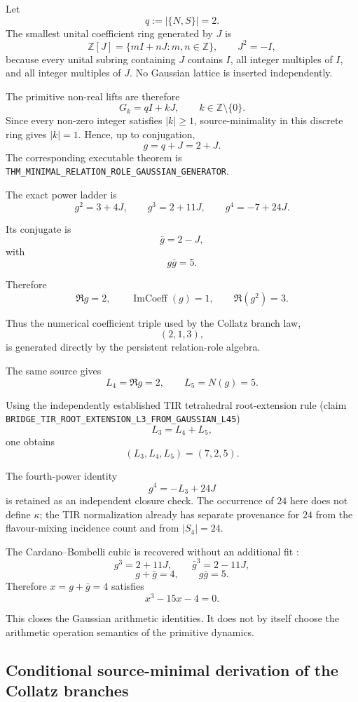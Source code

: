 \documentclass[11pt]{article}
\newcommand{\claimid}[1]{\nolinkurl{#1}}
\begin{document}
Let
\[
q:=|\{N,S\}|=2.
\]
The smallest unital coefficient ring generated by \(J\) is
\[
\boxed{
\mathbb Z[J]
=
\{mI+nJ:m,n\in\mathbb Z\},
\qquad
J^2=-I,
}
\]
because every unital subring containing \(J\) contains \(I\), all integer
multiples of \(I\), and all integer multiples of \(J\). No Gaussian lattice
is inserted independently.

The primitive non-real lifts are therefore
\[
G_k=qI+kJ,
\qquad
k\in\mathbb Z\setminus\{0\}.
\]
Since every non-zero integer satisfies \(|k|\ge1\), source-minimality in this
discrete ring gives \(|k|=1\). Hence, up to conjugation,
\[
\boxed{
g=q+J=2+J.
}
\]
The corresponding executable theorem is
\claimid{THM_MINIMAL_RELATION_ROLE_GAUSSIAN_GENERATOR}.

The exact power ladder is
\[
\boxed{
g^2=3+4J,
\qquad
g^3=2+11J,
\qquad
g^4=-7+24J.
}
\]

Its conjugate is
\[
\bar g=2-J,
\]
with
\[
\boxed{
g\bar g=5.
}
\]

Therefore
\[
\boxed{
\Re g=2,
\qquad
\operatorname{ImCoeff}(g)=1,
\qquad
\Re(g^2)=3.
}
\]

Thus the numerical coefficient triple used by the Collatz branch law,
\[
(2,1,3),
\]
is generated directly by the persistent relation-role algebra.

The same source gives
\[
\boxed{
L_4=\Re g=2,
\qquad
L_5=N(g)=5.
}
\]

Using the independently established TIR tetrahedral root-extension rule
(claim \claimid{BRIDGE_TIR_ROOT_EXTENSION_L3_FROM_GAUSSIAN_L45})
\cite{LipaTIRLConstants2026}
\[
L_3=L_4+L_5,
\]
one obtains
\[
\boxed{
(L_3,L_4,L_5)=(7,2,5).
}
\]

The fourth-power identity
\[
\boxed{
g^4=-L_3+24J
}
\]
is retained as an independent closure check. The occurrence of \(24\) here
does not define \(\kappa\); the TIR normalization already has separate
provenance for \(24\) from the flavour-mixing incidence count and from
\(|S_4|=24\).

The Cardano--Bombelli cubic is recovered without an additional fit
\cite{Cardano1545,Bombelli1572}:
\[
g^3=2+11J,
\qquad
\bar g^3=2-11J,
\]
\[
g+\bar g=4,
\qquad
g\bar g=5.
\]
Therefore \(x=g+\bar g=4\) satisfies
\[
\boxed{
x^3-15x-4=0.
}
\]

This closes the Gaussian arithmetic identities. It does not by itself choose
the arithmetic operation semantics of the primitive dynamics.

\subsection{Conditional source-minimal derivation of the Collatz branches}
\end{document}
